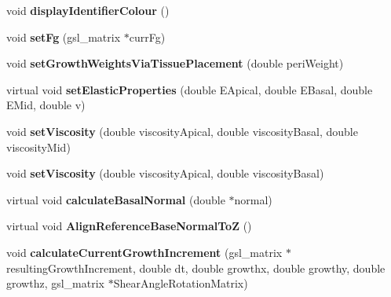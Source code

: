 \begin{DoxyCompactItemize}
\item 
\hypertarget{classShapeBase_aba6bb76d8adffaeb7ad36cce8a3f17ab}{}void {\bfseries display\+Identifier\+Colour} ()\label{classShapeBase_aba6bb76d8adffaeb7ad36cce8a3f17ab}

\item 
\hypertarget{classShapeBase_ad39c3f3a555a89e106c4afaaf81c72f6}{}void {\bfseries set\+Fg} (gsl\+\_\+matrix $\ast$curr\+Fg)\label{classShapeBase_ad39c3f3a555a89e106c4afaaf81c72f6}

\item 
\hypertarget{classShapeBase_a38a100fb162232636bf666eb1603f023}{}void {\bfseries set\+Growth\+Weights\+Via\+Tissue\+Placement} (double peri\+Weight)\label{classShapeBase_a38a100fb162232636bf666eb1603f023}

\item 
\hypertarget{classShapeBase_a948e9da80e40851c9813f8251d1979ec}{}virtual void {\bfseries set\+Elastic\+Properties} (double E\+Apical, double E\+Basal, double E\+Mid, double v)\label{classShapeBase_a948e9da80e40851c9813f8251d1979ec}

\item 
\hypertarget{classShapeBase_ac4e051a82edb9b987edfbd783076e348}{}void {\bfseries set\+Viscosity} (double viscosity\+Apical, double viscosity\+Basal, double viscosity\+Mid)\label{classShapeBase_ac4e051a82edb9b987edfbd783076e348}

\item 
\hypertarget{classShapeBase_a8b6ffc8d699795e4efb867efd065a679}{}void {\bfseries set\+Viscosity} (double viscosity\+Apical, double viscosity\+Basal)\label{classShapeBase_a8b6ffc8d699795e4efb867efd065a679}

\item 
\hypertarget{classShapeBase_ae7c003e9b98e31d04275ffb45709c9fa}{}virtual void {\bfseries calculate\+Basal\+Normal} (double $\ast$normal)\label{classShapeBase_ae7c003e9b98e31d04275ffb45709c9fa}

\item 
\hypertarget{classShapeBase_a362a15361e6fd25d65ed05f0cc31737a}{}virtual void {\bfseries Align\+Reference\+Base\+Normal\+To\+Z} ()\label{classShapeBase_a362a15361e6fd25d65ed05f0cc31737a}

\item 
\hypertarget{classShapeBase_ac2c05f660fb3d68482c8ba751b68b2ed}{}void {\bfseries calculate\+Current\+Growth\+Increment} (gsl\+\_\+matrix $\ast$resulting\+Growth\+Increment, double dt, double growthx, double growthy, double growthz, gsl\+\_\+matrix $\ast$Shear\+Angle\+Rotation\+Matrix)\label{classShapeBase_ac2c05f660fb3d68482c8ba751b68b2ed}


\end{DoxyCompactItemize}

